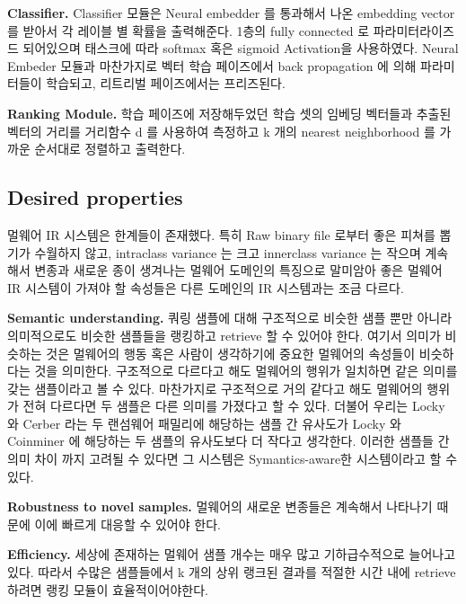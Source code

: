 \textbf{Classifier. }
Classifier 모듈은 Neural embedder 를 통과해서 나온 embedding vector 를 받아서 각 레이블 별 확률을 출력해준다. 1층의 fully connected 로 파라미터라이즈드 되어있으며 태스크에 따라 softmax 혹은 sigmoid Activation을 사용하였다. Neural Embeder 모듈과 마찬가지로 벡터 학습 페이즈에서 back propagation 에 의해 파라미터들이 학습되고, 리트리벌 페이즈에서는 프리즈된다. 

\textbf{Ranking Module. }
학습 페이즈에 저장해두었던 학습 셋의 임베딩 벡터들과 추출된 벡터의 거리를 거리함수 d 를 사용하여 측정하고 k 개의 nearest neighborhood 를 가까운 순서대로 정렬하고 출력한다.


\subsection{Desired properties}
멀웨어 IR 시스템은 한계들이 존재했다. 특히 Raw binary file 로부터 좋은 피쳐를 뽑기가 수월하지 않고, intraclass variance 는 크고 innerclass variance 는 작으며 계속해서 변종과 새로운 종이 생겨나는 멀웨어 도메인의 특징으로 말미암아 좋은 멀웨어 IR 시스템이 가져야 할 속성들은 다른 도메인의 IR 시스템과는 조금 다르다.

\textbf{Semantic understanding. }
쿼링 샘플에 대해 구조적으로 비슷한 샘플 뿐만 아니라 의미적으로도 비슷한 샘플들을 랭킹하고 retrieve 할 수 있어야 한다. 여기서 의미가 비슷하는 것은 멀웨어의 행동 혹은 사람이 생각하기에 중요한 멀웨어의 속성들이 비슷하다는 것을 의미한다. 구조적으로 다르다고 해도 멀웨어의 행위가 일치하면 같은 의미를 갖는 샘플이라고 볼 수 있다. 마찬가지로 구조적으로 거의 같다고 해도 멀웨어의 행위가 전혀 다르다면 두 샘플은 다른 의미를 가졌다고 할 수 있다. 더불어 우리는 Locky 와 Cerber 라는 두 랜섬웨어 패밀리에 해당하는 샘플 간 유사도가 Locky 와 Coinminer 에 해당하는 두 샘플의 유사도보다 더 작다고 생각한다. 이러한 샘플들 간 의미 차이 까지 고려될 수 있다면 그 시스템은 Symantics-aware한 시스템이라고 할 수 있다. 
 
\textbf{Robustness to novel samples. }
멀웨어의 새로운 변종들은 계속해서 나타나기 때문에 이에 빠르게 대응할 수 있어야 한다. 
%


\textbf{Efficiency. }
세상에 존재하는 멀웨어 샘플 개수는 매우 많고 기하급수적으로 늘어나고 있다. 따라서 수많은 샘플들에서 k 개의 상위 랭크된 결과를 적절한 시간 내에 retrieve 하려면 랭킹 모듈이 효율적이어야한다.



